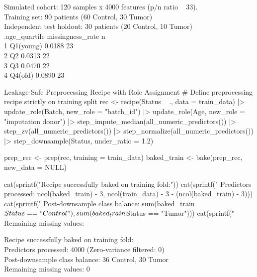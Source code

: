 \documentclass[11pt,oneside]{book}
\begin{document}
\begin{routput}
Simulated cohort: 120 samples x 4000 features (p/n ratio ~ 33).\\
Training set: 90 patients (60 Control, 30 Tumor)\\
Independent test holdout: 30 patients (20 Control, 10 Tumor)\\
\hspace*{1em}.age\_quartile missingness\_rate     n\\
1 Q1(young)               0.0188    23\\
2 Q2                      0.0313    22\\
3 Q3                      0.0470    22\\
4 Q4(old)                 0.0890    23
\end{routput}

\begin{rchunk}{Leakage-Safe Preprocessing Recipe with Role Assignment}
# Define preprocessing recipe strictly on training split
rec <- recipe(Status ~ ., data = train_data) |>
  update_role(Batch, new_role = "batch_id") |>
  update_role(Age, new_role = "imputation donor") |>
  step_impute_median(all_numeric_predictors()) |>
  step_zv(all_numeric_predictors()) |>
  step_normalize(all_numeric_predictors()) |>
  step_downsample(Status, under_ratio = 1.2)

prep_rec <- prep(rec, training = train_data)
baked_train <- bake(prep_rec, new_data = NULL)

cat(sprintf("Recipe successfully baked on training fold:\n"))
cat(sprintf("  Predictors processed: %
            ncol(baked_train) - 3, ncol(train_data) - 3 - (ncol(baked_train) - 3)))
cat(sprintf("  Post-downsample class balance: %
            sum(baked_train$Status == "Control"), sum(baked_train$Status == "Tumor")))
cat(sprintf("  Remaining missing values: %
\end{rchunk}

\begin{routput}
Recipe successfully baked on training fold:\\
\hspace*{2em}Predictors processed: 4000 (Zero-variance filtered: 0)\\
\hspace*{2em}Post-downsample class balance: 36 Control, 30 Tumor\\
\hspace*{2em}Remaining missing values: 0
\end{routput}
\end{document}
